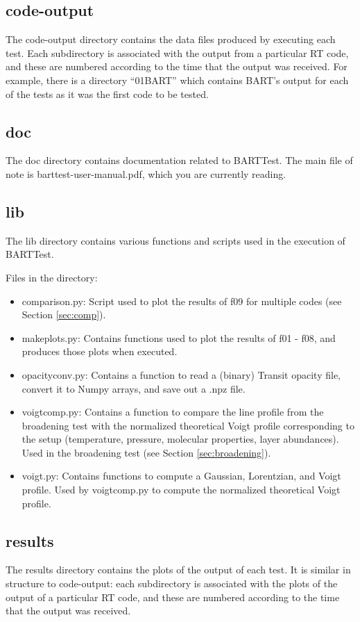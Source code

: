 \documentclass[letterpaper, 12pt]{article}
\begin{document}
\subsection{code-output}
\label{sec:output}
The code-output directory contains the data files produced by executing 
each test. Each subdirectory is associated with the output from a particular 
RT code, and these are numbered according to the time that the output was 
received. For example, there is a directory ``01BART'' which contains BART's 
output for each of the tests as it was the first code to be tested.

\subsection{doc}
The doc directory contains documentation related to BARTTest. The main file 
of note is barttest-user-manual.pdf, which you are currently reading.

\subsection{lib}
The lib directory contains various functions and scripts used in the execution 
of BARTTest.

Files in the directory:
\begin{itemize} \itemsep0pt
  \item comparison.py: Script used to plot the results of f09 for multiple codes (see Section \ref{sec:comp}).
  \item makeplots.py: Contains functions used to plot the results of f01 - f08, and produces those plots when executed.
  \item opacityconv.py: Contains a function to read a (binary) Transit opacity file, convert it to Numpy arrays, and save out a .npz file.
  \item voigtcomp.py: Contains a function to compare the line profile from the 
broadening test with the normalized theoretical Voigt profile corresponding to the setup (temperature, pressure, molecular properties, layer abundances). Used in the broadening test (see Section \ref{sec:broadening}).
  \item voigt.py: Contains functions to compute a Gaussian, Lorentzian, and Voigt profile. Used by voigtcomp.py to compute the normalized theoretical Voigt profile.
\end{itemize}

\subsection{results}
\label{sec:results}
The results directory contains the plots of the output of each test. It is 
similar in structure to code-output: each subdirectory is associated with 
the plots of the output of a particular RT code, and these are numbered 
according to the time that the output was received. 
\end{document}
